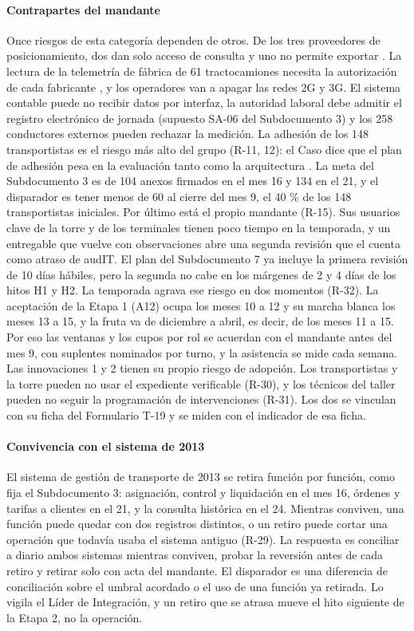 \paragraph{Contrapartes del mandante}
Once riesgos de esta categoría dependen de otros. De los tres proveedores de posicionamiento, dos dan solo acceso de
consulta y uno no permite exportar . La lectura de la telemetría de fábrica de
61 tractocamiones necesita la autorización de cada fabricante , y los operadores
van a apagar las redes 2G y 3G. El sistema contable puede no recibir datos por interfaz, la autoridad
laboral debe admitir el registro electrónico de jornada (supuesto SA-06 del Subdocumento 3) y los 258
conductores externos pueden rechazar la medición. La adhesión de los 148 transportistas es el riesgo más
alto del grupo (R-11, 12): el Caso dice que el plan de adhesión pesa en la evaluación tanto como la arquitectura
. La meta del Subdocumento 3 es de 104 anexos firmados en el mes 16 y 134 en el
21, y el disparador es tener menos de 60 al cierre del mes 9, el 40 \% de los 148 transportistas iniciales. Por último
está el propio mandante (R-15). Sus usuarios clave de la torre y de los terminales tienen poco tiempo en
la temporada, y un entregable que vuelve con observaciones abre una segunda revisión que el
 cuenta como atraso de audIT. El plan del Subdocumento 7 ya incluye la primera revisión de
10 días hábiles, pero la segunda no cabe en los márgenes de 2 y 4 días de los hitos H1 y H2.
La temporada agrava ese riesgo en dos momentos (R-32). La aceptación de la Etapa 1 (A12) ocupa los meses
10 a 12 y su marcha blanca los meses 13 a 15, y la fruta va de diciembre a abril, es decir, de los meses
11 a 15. Por eso las ventanas y los cupos por rol se acuerdan con el mandante antes del mes 9, con
suplentes nominados por turno, y la asistencia se mide cada semana. Las innovaciones 1 y 2 tienen su
propio riesgo de adopción. Los transportistas y la torre pueden no usar el expediente verificable
(R-30), y los técnicos del taller pueden no seguir la programación de intervenciones (R-31). Los dos
se vinculan con su ficha del Formulario T-19 y se miden con el indicador de esa ficha.

\paragraph{Convivencia con el sistema de 2013}
El sistema de gestión de transporte de 2013 se retira función por función, como fija el Subdocumento 3:
asignación, control y liquidación en el mes 16, órdenes y tarifas a clientes en el 21, y la consulta
histórica en el 24. Mientras conviven, una función puede quedar con dos registros distintos, o un
retiro puede cortar una operación que todavía usaba el sistema antiguo (R-29). La respuesta es
conciliar a diario ambos sistemas mientras conviven, probar la reversión antes de cada retiro y retirar
solo con acta del mandante. El disparador es una diferencia de conciliación sobre el umbral acordado o
el uso de una función ya retirada. Lo vigila el Líder de Integración, y un retiro que se atrasa mueve el
hito siguiente de la Etapa 2, no la operación.

